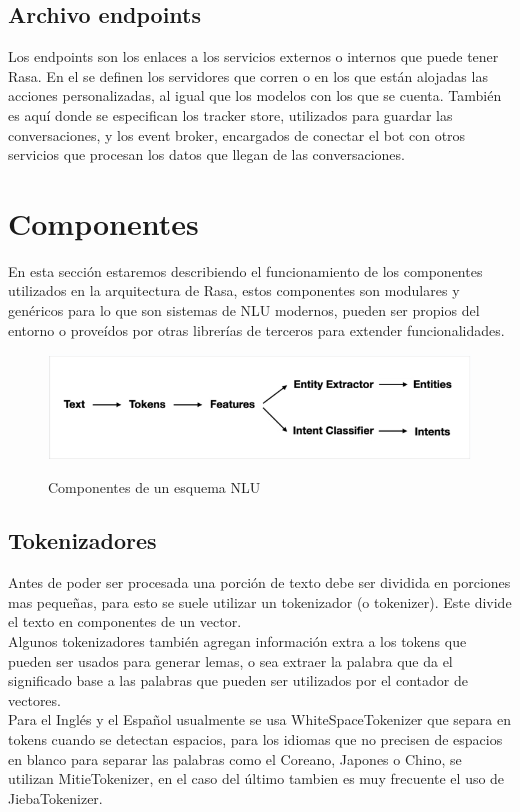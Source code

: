 \subsection{Archivo endpoints}
Los endpoints son los enlaces a los servicios externos o internos que puede tener Rasa. En el se
definen los servidores que corren o en los que están alojadas las acciones personalizadas, al igual
que los modelos con los que se cuenta. También es aquí donde se especifican los tracker store,
utilizados para guardar las conversaciones, y los event broker, encargados de conectar el bot con
otros servicios que procesan los datos que llegan de las conversaciones.

\section{Componentes}\label{ch:Componentes}
En esta sección estaremos describiendo el funcionamiento de los componentes utilizados en la
arquitectura de Rasa,
estos componentes son modulares y genéricos para lo que son sistemas de NLU modernos, pueden ser
propios del
entorno o proveídos por otras librerías de terceros para extender funcionalidades.

\begin{figure}[h]
	\centering
	\includegraphics[width=\textwidth]{imagenes/cap3/rasa_components.png}
	\caption{Componentes de un esquema NLU}
	\label{fig:Componentes-MLU}
	\cite{Rasa}
\end{figure}

\subsection{Tokenizadores}
Antes de poder ser procesada una porción de texto debe ser dividida en porciones mas pequeñas, para
esto se suele utilizar
un tokenizador (o tokenizer).	Este divide el texto en componentes de un vector.\\ Algunos
tokenizadores también
agregan información extra a los tokens que pueden ser usados para generar lemas, o sea extraer la
palabra que da el significado base a las palabras que pueden ser utilizados por el contador de
vectores.\\
Para el Inglés y el Español usualmente se usa WhiteSpaceTokenizer que separa en tokens cuando se
detectan espacios, para los idiomas que no precisen de espacios en blanco para separar las palabras
como el Coreano, Japones o Chino, se utilizan MitieTokenizer, en el caso del último tambien es muy
frecuente el uso de JiebaTokenizer.\cite{warmerdam_2022}


